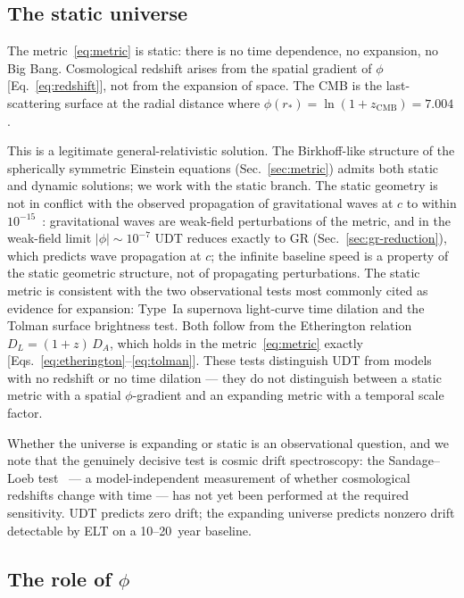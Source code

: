 \documentclass[aps,prd,twocolumn,superscriptaddress,nofootinbib,longbibliography]{revtex4-2}
\newcommand{\rstar}{r_{*}}
\begin{document}
\subsection{The static universe}

The metric~\eqref{eq:metric} is static: there is no time dependence,
no expansion, no Big Bang.  Cosmological redshift arises from the
spatial gradient of $\phi$ [Eq.~\eqref{eq:redshift}], not from the
expansion of space.  The CMB is the last-scattering surface at the
radial distance where $\phi(\rstar) = \ln(1+z_{\mathrm{CMB}}) = 7.004$.

This is a legitimate general-relativistic solution.  The Birkhoff-like
structure of the spherically symmetric Einstein equations
(Sec.~\ref{sec:metric}) admits both static and dynamic solutions; we
work with the static branch.  The static geometry is not in conflict
with the observed propagation of gravitational waves at $c$ to within
$10^{-15}$~\cite{GW170817,Will2014}: gravitational waves are weak-field
perturbations of the metric, and in the weak-field limit
$|\phi| \sim 10^{-7}$ UDT reduces exactly to GR
(Sec.~\ref{sec:gr-reduction}), which predicts wave propagation at
$c$; the infinite baseline speed is a property of the static geometric
structure, not of propagating perturbations.  The static metric is consistent with the two observational tests most
commonly cited as evidence for expansion: Type~Ia supernova
light-curve time dilation and the Tolman surface brightness test.
Both follow from the Etherington relation $D_L = (1+z)\,D_A$, which
holds in the metric~\eqref{eq:metric} exactly
[Eqs.~\eqref{eq:etherington}--\eqref{eq:tolman}].  These tests
distinguish UDT from models with no redshift or no time dilation ---
they do not distinguish between a static metric with a spatial
$\phi$-gradient and an expanding metric with a temporal scale factor.

Whether the universe is expanding or static is an observational
question, and we note that the genuinely decisive test is cosmic drift
spectroscopy: the Sandage--Loeb
test~\cite{Sandage1962,Loeb1998} --- a model-independent measurement
of whether cosmological redshifts change with time --- has not yet
been performed at the required sensitivity.  UDT predicts zero drift;
the expanding universe predicts nonzero drift detectable by ELT on a
10--20~year baseline.

\subsection{The role of $\phi$}
\end{document}
